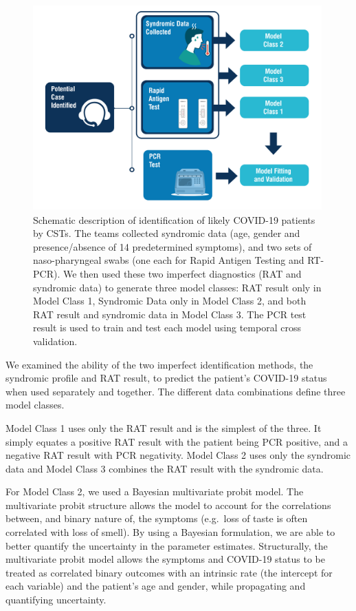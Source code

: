 \documentclass[]{elsarticle} %
\begin{document}
\begin{figure}
\hypertarget{fig:data-flowchart}{%
\centering
\includegraphics[width=4.375in,height=3.10417in]{MainTextFigs/DataFlowchart.pdf}
\caption{Schematic description of identification of likely COVID-19
patients by CSTs. The teams collected syndromic data (age, gender and
presence/absence of 14 predetermined symptoms), and two sets of
naso-pharyngeal swabs (one each for Rapid Antigen Testing and RT-PCR).
We then used these two imperfect diagnostics (RAT and syndromic data) to
generate three model classes: RAT result only in Model Class 1,
Syndromic Data only in Model Class 2, and both RAT result and syndromic
data in Model Class 3. The PCR test result is used to train and test
each model using temporal cross validation.}\label{fig:data-flowchart}
}
\end{figure}

We examined the ability of the two imperfect identification methods, the
syndromic profile and RAT result, to predict the patient's COVID-19
status when used separately and together. The different data
combinations define three model classes.

Model Class 1 uses only the RAT result and is the simplest of the three.
It simply equates a positive RAT result with the patient being PCR
positive, and a negative RAT result with PCR negativity. Model Class 2
uses only the syndromic data and Model Class 3 combines the RAT result
with the syndromic data.

For Model Class 2, we used a Bayesian multivariate probit model. The
multivariate probit structure allows the model to account for the
correlations between, and binary nature of, the symptoms (e.g.~loss of
taste is often correlated with loss of smell). By using a Bayesian
formulation, we are able to better quantify the uncertainty in the
parameter estimates. Structurally, the multivariate probit model allows
the symptoms and COVID-19 status to be treated as correlated binary
outcomes with an intrinsic rate (the intercept for each variable) and
the patient's age and gender, while propagating and quantifying
uncertainty.
\end{document}
